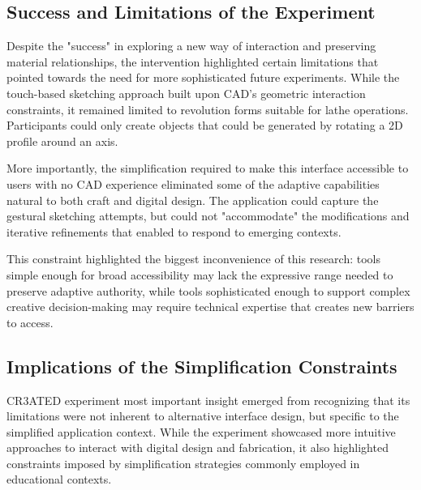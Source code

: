 \vspace{0.5cm}

\subsection{Success and Limitations of the Experiment}

Despite the "success" in exploring a new way of interaction and preserving material relationships, the intervention highlighted certain limitations that pointed towards the need for more sophisticated future experiments. While the touch-based sketching approach built upon CAD's geometric interaction constraints, it remained limited to revolution forms suitable for lathe operations. Participants could only create objects that could be generated by rotating a 2D profile around an axis.

\vspace{0.5cm}

More importantly, the simplification required to make this interface accessible to users with no CAD experience eliminated some of the adaptive capabilities natural to both craft and digital design. The application could capture the gestural sketching attempts, but could not "accommodate" the modifications and iterative refinements that enabled to respond to emerging contexts.

\vspace{0.5cm}

This constraint highlighted the biggest inconvenience of this research: tools simple enough for broad accessibility may lack the expressive range needed to preserve adaptive authority, while tools sophisticated enough to support complex creative decision-making may require technical expertise that creates new barriers to access.

\subsection{Implications of the Simplification Constraints}

CR3ATED experiment most important insight emerged from recognizing that its limitations were not inherent to alternative interface design, but specific to the simplified application context. While the experiment showcased more intuitive approaches to interact with digital design and fabrication, it also highlighted constraints imposed by simplification strategies commonly employed in educational contexts.

\vspace{0.5cm}

